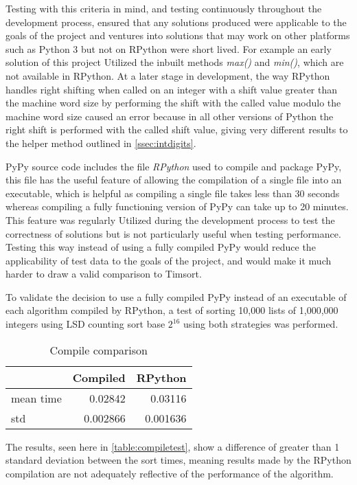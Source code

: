 \documentclass[12pt]{article}
\begin{document}
\par 
Testing with this criteria in mind, and testing continuously throughout the development process, ensured that any solutions produced were applicable to the goals of the project and ventures into solutions that may work on other platforms such as Python 3 but not on RPython were short lived. For example an early solution of this project Utilized the inbuilt methods \textit{max()} and \textit{min()}, which are not available in RPython. At a later stage in development, the way RPython handles right shifting when called on an integer with a shift value greater than the machine word size by performing the shift with the called value modulo the machine word size caused an error because in all other versions of Python the right shift is performed with the called shift value, giving very different results to the helper method outlined in \ref{ssec:intdigits}.

\par 
PyPy source code includes the file \textit{RPython} used to compile and package PyPy, this file has the useful feature of allowing the compilation of a single file into an executable, which is helpful as compiling a single file takes less than 30 seconds whereas compiling a fully functioning version of PyPy can take up to 20 minutes. This feature was regularly Utilized during the development process to test the correctness of solutions but is not particularly useful when testing performance. Testing this way instead of using a fully compiled PyPy would reduce the applicability of test data to the goals of the project, and would make it much harder to draw a valid comparison to Timsort. 
\par
To validate the decision to use a fully compiled PyPy instead of an executable of each algorithm compiled by RPython, a test of sorting 10,000 lists of 1,000,000 integers using LSD counting sort base $2^{16}$ using both strategies was performed.
\linebreak

\begin{table}[h]
\centering
	\begin{tabular}{lrr}
		\toprule
		 & Compiled & RPython \\
		\midrule
		mean time & 0.02842 & 0.03116 \\
		std & 0.002866 & 0.001636 \\
		\bottomrule
		
		
	\end{tabular}
	\caption{Compile comparison}
	\label{table:compiletest}
\end{table}
The results, seen here in \autoref{table:compiletest}, show a difference of greater than 1 standard deviation between the sort times, meaning results made by the RPython compilation are not adequately reflective of the performance of the algorithm. 
\end{document}
